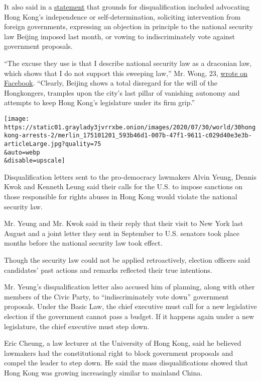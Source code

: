 It also said in a
\href{https://www.info.gov.hk/gia/general/202007/30/P2020073000481.htm}{statement}
that grounds for disqualification included advocating Hong Kong's
independence or self-determination, soliciting intervention from foreign
governments, expressing an objection in principle to the national
security law Beijing imposed last month, or vowing to indiscriminately
vote against government proposals.

``The excuse they use is that I describe national security law as a
draconian law, which shows that I do not support this sweeping law,''
Mr. Wong, 23,
\href{https://www.facebookcorewwwi.onion/joshuawongchifung/photos/a.313299448762570/3193915534034266/}{wrote
on Facebook}. ``Clearly, Beijing shows a total disregard for the will of
the Hongkongers, tramples upon the city's last pillar of vanishing
autonomy and attempts to keep Hong Kong's legislature under its firm
grip.''

\texttt{[image: https://static01.graylady3jvrrxbe.onion/images/2020/07/30/world/30hongkong-arrests-2/merlin\_175101201\_593b46d1-007b-47f1-9611-c029d40e3e3b-articleLarge.jpg?quality=75\\\&auto=webp\\\&disable=upscale]}

Disqualification letters sent to the pro-democracy lawmakers Alvin
Yeung, Dennis Kwok and Kenneth Leung said their calls for the U.S. to
impose sanctions on those responsible for rights abuses in Hong Kong
would violate the national security law.

Mr. Yeung and Mr. Kwok said in their reply that their visit to New York
last August and a joint letter they sent in September to U.S. senators
took place months before the national security law took effect.

Though the security law could not be applied retroactively, election
officers said candidates' past actions and remarks reflected their true
intentions.

Mr. Yeung's disqualification letter also accused him of planning, along
with other members of the Civic Party, to ``indiscriminately vote down''
government proposals. Under the Basic Law, the chief executive must call
for a new legislative election if the government cannot pass a budget.
If it happens again under a new legislature, the chief executive must
step down.

Eric Cheung, a law lecturer at the University of Hong Kong, said he
believed lawmakers had the constitutional right to block government
proposals and compel the leader to step down. He said the mass
disqualifications showed that Hong Kong was growing increasingly similar
to mainland China.

